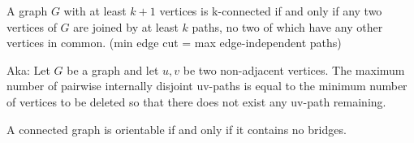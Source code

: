 \begin{theorem}
    A graph $G$ with at least $k+1$ vertices is k-connected if and only if any two vertices of $G$ are joined by at least $k$ paths, no two of which have any other vertices in common. (min edge cut = max edge-independent paths)

    Aka: Let $G$ be a graph and let $u,v$ be two non-adjacent vertices. The maximum number of pairwise internally disjoint uv-paths is equal to the minimum number of vertices to be deleted so that there does not exist any uv-path remaining.
\end{theorem}

\begin{theorem}
    A connected graph is orientable if and only if it contains no bridges.
\end{theorem}
